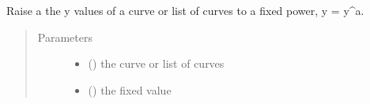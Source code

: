 \documentclass[letterpaper,10pt,english]{sphinxmanual}
\begin{document}

\begin{fulllineitems}
\label{\detokenize{pydv:pydvpy.powr}}
Raise a the y values of a curve or list of curves to a fixed power, y = y\textasciicircum{}a.

\begin{sphinxVerbatim}[commandchars=\\\{\}]
  
\end{sphinxVerbatim}

\begin{sphinxVerbatim}[commandchars=\\\{\}]
  
\end{sphinxVerbatim}

\begin{sphinxVerbatim}[commandchars=\\\{\}]
\PYG{p}{[}\PYG{p}{]} 
\end{sphinxVerbatim}
\begin{quote}\begin{description}
\item[{Parameters}] \leavevmode\begin{itemize}
\item {} 
 () \textendash{} the curve or list of curves

\item {} 
 () \textendash{} the fixed value

\end{itemize}

\end{description}\end{quote}

\end{fulllineitems}
\end{document}
